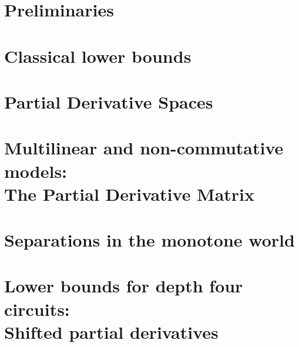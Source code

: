 \onehalfspace




\tableofcontents



\part{Preliminaries}










\part{Classical lower bounds}






\part{Partial Derivative Spaces}





\part[Multilinear and non-commutative models]{Multilinear and non-commutative models:\\The Partial Derivative Matrix}











\part{Separations in the monotone world}





\part[Lower bounds for depth four circuits]{Lower bounds for depth four circuits:\\Shifted partial derivatives}

